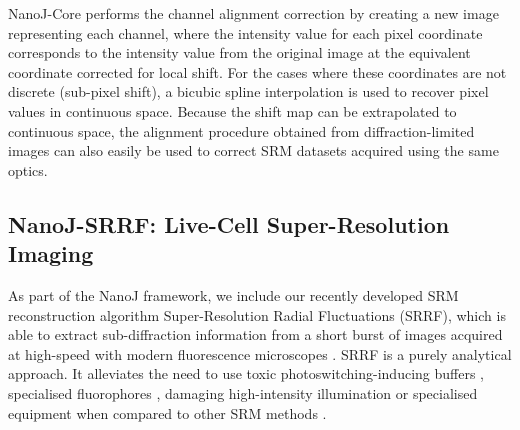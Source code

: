  NanoJ-Core performs the channel alignment correction by creating a new image representing each channel, where the intensity value for each pixel coordinate corresponds to the intensity value from the original image at the equivalent coordinate corrected for local shift. For the cases where these coordinates are not discrete (sub-pixel shift), a bicubic spline interpolation is used to recover pixel values in continuous space. Because the shift map can be extrapolated to continuous space, the alignment procedure obtained from diffraction-limited images can also easily be used to correct SRM datasets acquired using the same optics.
 
\subsection*{NanoJ-SRRF: Live-Cell Super-Resolution Imaging}

 As part of the NanoJ framework, we include our recently developed SRM reconstruction algorithm Super-Resolution Radial Fluctuations (SRRF), which is able to extract sub-diffraction information from a short burst of images acquired at high-speed with modern fluorescence microscopes \cite{gustafsson2016fast,culley2018srrf}. SRRF is a purely analytical approach. It alleviates the need to use toxic photoswitching-inducing buffers \cite{henriques2011palm}, specialised fluorophores \cite{dempsey2011evaluation,henriques2009palm}, damaging high-intensity illumination \cite{waldchen2015light} or specialised equipment \cite{gustafsson2000surpassing,hell1994breaking} when compared to other SRM methods \cite{betzig2006imaging,rust2006sub,gustafsson2000surpassing,hell1994breaking}.
 
